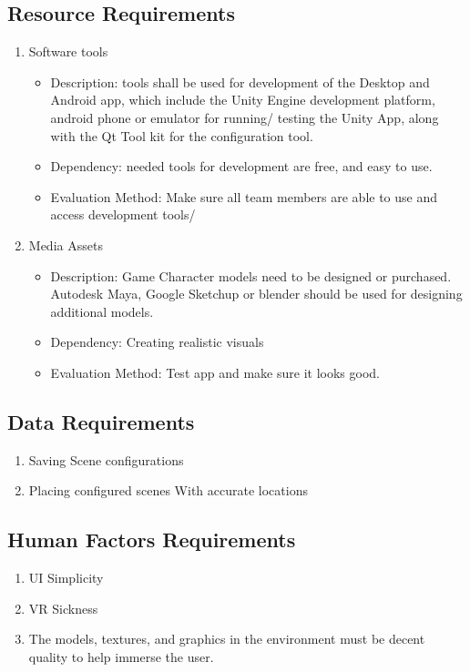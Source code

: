 \documentclass[a4paper,10pt]{article}
\begin{document}
	\subsection{Resource Requirements}
	\begin{enumerate}
	 \item Software tools
	 \begin{itemize}
	 \item Description: tools shall be used for development of the Desktop and Android app, which include 
	 the Unity Engine development platform, android phone or emulator for running/ testing the Unity App,
	  along with the Qt Tool kit for the configuration tool.
	 \item  Dependency: needed tools for development are free, and easy to use. 
	 \item Evaluation Method: Make sure all team members are able to use and access development tools/
	  \end{itemize}
	 \item Media Assets
	\begin{itemize}
	  \item Description: Game Character models need to be designed or purchased. Autodesk Maya, Google Sketchup or blender should be used for designing additional models. 
	  \item Dependency: Creating realistic visuals 
	  \item Evaluation Method: Test app and make sure it looks good.
	 \end{itemize}
	\end{enumerate}

	\subsection{Data Requirements}
	\begin{enumerate}
	 \item Saving Scene configurations
	 \item Placing configured scenes With accurate locations
	\end{enumerate}

	\subsection{Human Factors Requirements}
	\begin{enumerate}
	 \item UI Simplicity
	 \item VR Sickness	 
	 \item The models, textures, and graphics in the environment must be decent quality to help immerse the user.
	 \end{enumerate}
\end{document}
